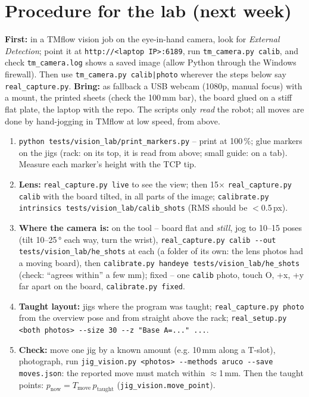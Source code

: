 \documentclass[11pt,a4paper]{article}
\newcommand{\code}[1]{\texttt{\small #1}}
\begin{document}
\section{Procedure for the lab (next week)}
\textbf{First:} in a TMflow vision job on the eye-in-hand camera, look for \emph{External Detection}; point it at
\code{http://<laptop IP>:6189}, run \code{tm\_camera.py calib}, and check \code{tm\_camera.log} shows a saved image
(allow Python through the Windows firewall). Then use \code{tm\_camera.py calib|photo} wherever the steps below say
\code{real\_capture.py}. \textbf{Bring:} as fallback a USB webcam (1080p, manual focus) with a mount, the printed sheets (check the 100\,mm bar), the board glued on a stiff flat plate, the laptop with the repo.
The scripts only \emph{read} the robot; all moves are done by hand-jogging in TMflow at low speed, from above.
\begin{enumerate}
\item \code{python tests/vision\_lab/print\_markers.py} -- print at 100\,\%; glue markers on the jigs (rack: on its top,
it is read from above; small guide: on a tab). Measure each marker's height with the TCP tip.
\item \textbf{Lens:} \code{real\_capture.py live} to see the view; then 15$\times$ \code{real\_capture.py calib} with the
board tilted, in all parts of the image; \code{calibrate.py intrinsics tests/vision\_lab/calib\_shots} (RMS should be
$<$0.5\,px).
\item \textbf{Where the camera is:} on the tool -- board flat and \emph{still}, jog to 10--15 poses (tilt 10--25\,° each
way, turn the wrist), \code{real\_capture.py calib -{}-out tests/vision\_lab/he\_shots} at each (a folder of its own:
the lens photos had a moving board), then \code{calibrate.py handeye tests/vision\_lab/he\_shots} (check: ``agrees
within'' a few mm); fixed -- one \code{calib} photo, touch O, +x, +y far apart on the board, \code{calibrate.py fixed}.
\item \textbf{Taught layout:} jigs where the program was taught; \code{real\_capture.py photo} from the overview pose and
from straight above the rack; \code{real\_setup.py <both photos> -{}-size 30 -{}-z "Base A=..." ...}.
\item \textbf{Check:} move one jig by a known amount (e.g. 10\,mm along a T-slot), photograph, run
\code{jig\_vision.py <photos> -{}-methods aruco -{}-save moves.json}: the reported move must match within
$\approx$1\,mm.
Then the taught points: $p_\text{now}=T_\text{move}\,p_\text{taught}$ (\code{jig\_vision.move\_point}).
\end{enumerate}
\end{document}
